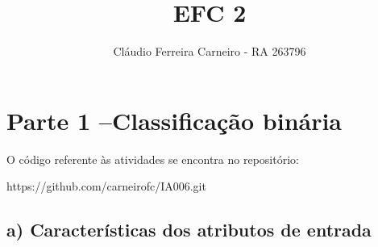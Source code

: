 \documentclass{article}
\author{Cláudio Ferreira Carneiro - RA 263796}
\title{EFC 2}
\begin{document}
    \maketitle
    \newpage
    \section[]{Parte 1 –Classificação binária}
    O código referente às atividades se encontra no repositório:
    
    https://github.com/carneirofc/IA006.git\linebreak
    
    \subsection[]{a) Características dos atributos de entrada}
\end{document}
